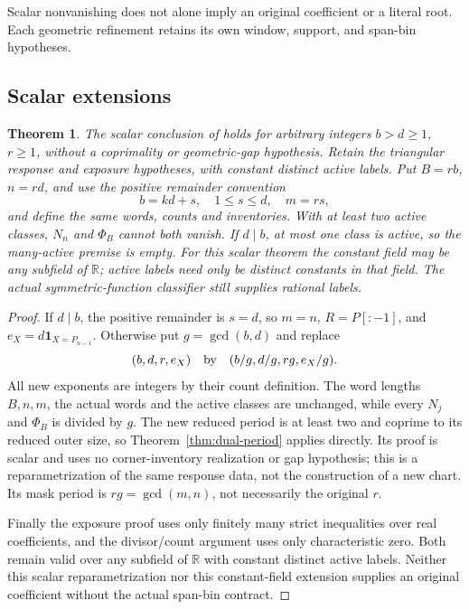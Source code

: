\documentclass[11pt,a4paper]{amsart}
\numberwithin{equation}{section}
\theoremstyle{plain}
\newtheorem{theorem}{Theorem}[section]
\theoremstyle{definition}
\begin{document}
Scalar nonvanishing does not alone imply an original coefficient or a literal root.  Each geometric refinement retains its own window, support, and span-bin hypotheses.

\subsection{Scalar extensions}

\begin{theorem}\label{thm:dual-general}
The scalar conclusion of  holds for arbitrary integers \(b>d\ge1\), \(r\ge1\), without a coprimality or geometric-gap hypothesis.  Retain the triangular response and exposure hypotheses, with constant distinct active labels.  Put \(B=rb\), \(n=rd\), and use the positive remainder convention
\[
 b=kd+s,\quad1\le s\le d,\quad m=rs,
\]
and define the same words, counts and inventories.  With at least two active classes, \(N_n\) and \(\Phi_B\) cannot both vanish.  If \(d\mid b\), at most one class is active, so the many-active premise is empty.  For this scalar theorem the constant field may be any subfield of \(\mathbb R\); active labels need only be distinct constants in that field.  The actual symmetric-function classifier still supplies rational labels.
\end{theorem}
\begin{proof}
If \(d\mid b\), the positive remainder is \(s=d\), so \(m=n\), \(R=P[:-1]\), and \(e_X=d\mathbf1_{X=P_{n-1}}\).  Otherwise put \(g=\gcd(b,d)\) and replace
\[
 (b,d,r,e_X)\quad\hbox{by}\quad(b/g,d/g,rg,e_X/g).
\]
All new exponents are integers by their count definition.  The word lengths \(B,n,m\), the actual words and the active classes are unchanged, while every \(N_j\) and \(\Phi_B\) is divided by \(g\).  The new reduced period is at least two and coprime to its reduced outer size, so Theorem~\ref{thm:dual-period} applies directly.  Its proof is scalar and uses no corner-inventory realization or gap hypothesis; this is a reparametrization of the same response data, not the construction of a new chart.  Its mask period is \(rg=\gcd(m,n)\), not necessarily the original \(r\).

Finally the exposure proof uses only finitely many strict inequalities over real coefficients, and the divisor/count argument uses only characteristic zero.  Both remain valid over any subfield of \(\mathbb R\) with constant distinct active labels.  Neither this scalar reparametrization nor this constant-field extension supplies an original coefficient without the actual span-bin contract.
\end{proof}
\end{document}
